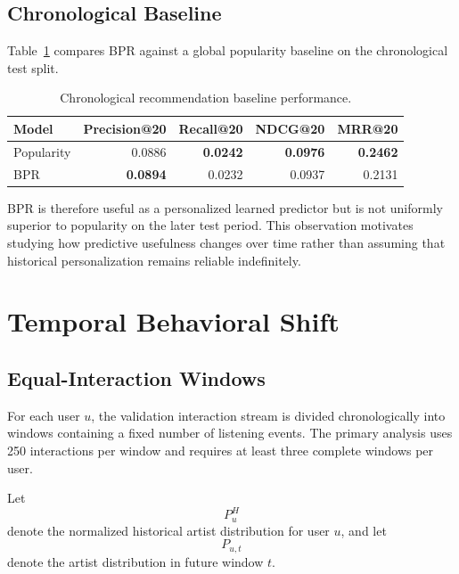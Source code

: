 \documentclass[11pt]{article}
\begin{document}
\subsection{Chronological Baseline}

Table~\ref{tab:baseline} compares BPR against a global popularity
baseline on the chronological test split.

\begin{table}[H]
\centering
\caption{Chronological recommendation baseline performance.}
\label{tab:baseline}
\begin{tabular}{lrrrr}
\toprule
Model
& Precision@20
& Recall@20
& NDCG@20
& MRR@20 \\
\midrule
Popularity
& 0.0886
& \textbf{0.0242}
& \textbf{0.0976}
& \textbf{0.2462} \\
BPR
& \textbf{0.0894}
& 0.0232
& 0.0937
& 0.2131 \\
\bottomrule
\end{tabular}
\end{table}

BPR is therefore useful as a personalized learned predictor but is not
uniformly superior to popularity on the later test period. This
observation motivates studying how predictive usefulness changes over
time rather than assuming that historical personalization remains
reliable indefinitely.


\section{Temporal Behavioral Shift}

\subsection{Equal-Interaction Windows}

For each user $u$, the validation interaction stream is divided
chronologically into windows containing a fixed number of listening
events. The primary analysis uses 250 interactions per window and
requires at least three complete windows per user.

Let
%
\begin{equation}
    P_u^{H}
\end{equation}
%
denote the normalized historical artist distribution for user $u$, and
let
%
\begin{equation}
    P_{u,t}
\end{equation}
%
denote the artist distribution in future window $t$.
\end{document}
